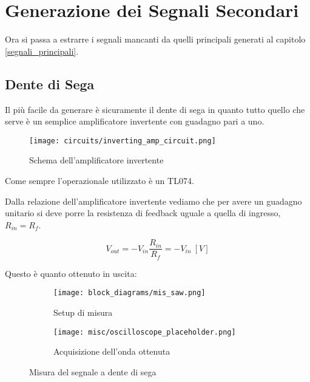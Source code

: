 \chapter{Generazione dei Segnali Secondari}\label{segnali_secondari}


Ora si passa a estrarre i segnali mancanti da quelli principali generati al capitolo \ref{segnali_principali}.


\section{Dente di Sega}


Il più facile da generare è sicuramente il dente di sega in quanto tutto quello che serve è un
semplice amplificatore invertente con guadagno pari a uno.

\begin{figure}[H]
    \centering
    \texttt{[image: circuits/inverting\_amp\_circuit.png]}
    \caption{Schema dell'amplificatore invertente}
    \label{inverting_amp_circuit}
\end{figure}

Come sempre l'operazionale utilizzato è un TL074.

Dalla relazione dell'amplificatore invertente vediamo che per avere un guadagno unitario si
deve porre la resistenza di feedback uguale a quella di ingresso, $R_{in}=R_f$.

\begin{equation}
    V_{out}=-V_{in}\frac{R_{in}}{R_f}=-V_{in}\ [V]
\end{equation}

Questo è quanto ottenuto in uscita:

\begin{figure}[H]
    \centering

    \begin{subfigure}{.5\textwidth}
        \centering
        \texttt{[image: block\_diagrams/mis\_saw.png]}
        \caption{Setup di misura}
        \label{mis_saw}
    \end{subfigure}%
    \begin{subfigure}{.5\textwidth}
        \centering
        \texttt{[image: misc/oscilloscope\_placeholder.png]}
        \caption{Acquisizione dell'onda ottenuta}
        \label{acq_saw}
    \end{subfigure}

    \caption{Misura del segnale a dente di sega}
\end{figure}

